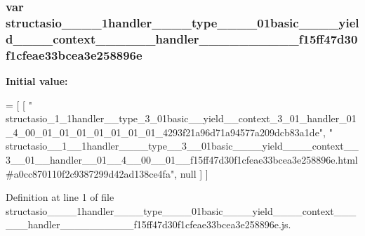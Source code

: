 \subsubsection[{structasio\+\_\+\+\_\+1\+\_\+\+\_\+1handler\+\_\+\+\_\+\+\_\+\+\_\+type\+\_\+\+\_\+3\+\_\+\+\_\+01basic\+\_\+\+\_\+\+\_\+\+\_\+yield\+\_\+\+\_\+\+\_\+\+\_\+context\+\_\+\+\_\+3\+\_\+\+\_\+01\+\_\+\+\_\+handler\+\_\+\+\_\+01\+\_\+\+\_\+4\+\_\+\+\_\+00\+\_\+\+\_\+01\+\_\+\+\_\+f15ff47d30f1cfeae33bcea3e258896e}]{\setlength{\rightskip}{0pt plus 5cm}var structasio\+\_\+\+\_\+\_\+\+\_\+1handler\+\_\+\+\_\+\+\_\+\+\_\+type\+\_\+\+\_\+\_\+\+\_\+01basic\+\_\+\+\_\+\+\_\+\+\_\+yield\+\_\+\+\_\+\+\_\+\+\_\+context\+\_\+\+\_\+\_\+\+\_\+\_\+\+\_\+handler\+\_\+\+\_\+\_\+\+\_\+\_\+\+\_\+\_\+\+\_\+\_\+\+\_\+f15ff47d30f1cfeae33bcea3e258896e}\label{structasio____1____1handler________type____3____01basic________yield________context____3____01__70a2be6274fc9174947bd309a3388a7a_aafda4fb4a820fd33c40a366363743fb2}
{\bfseries Initial value\+:}
\begin{DoxyCode}
=
[
    [ \textcolor{stringliteral}{"
      structasio\_1\_1handler\_\_type\_3\_01basic\_\_yield\_\_context\_3\_01\_handler\_01\_4\_00\_01\_01\_01\_01\_01\_01\_01\_4293f21a96d71a94577a209dcb83a1de"}, \textcolor{stringliteral}{"
      structasio\_\_1\_\_1handler\_\_\_\_type\_\_3\_\_01basic\_\_\_\_yield\_\_\_\_context\_\_3\_\_01\_\_handler\_\_01\_\_4\_\_00\_\_01\_\_f15ff47d30f1cfeae33bcea3e258896e.html#a0cc870110f2c9387299d42ad138ce4fa"}, null ]
]
\end{DoxyCode}


Definition at line 1 of file structasio\+\_\+\+\_\+\_\+\+\_\+1handler\+\_\+\+\_\+\+\_\+\+\_\+type\+\_\+\+\_\+\_\+\+\_\+01basic\+\_\+\+\_\+\+\_\+\+\_\+yield\+\_\+\+\_\+\+\_\+\+\_\+context\+\_\+\+\_\+\_\+\+\_\+\_\+\+\_\+handler\+\_\+\+\_\+\_\+\+\_\+\_\+\+\_\+\_\+\+\_\+\_\+\+\_\+f15ff47d30f1cfeae33bcea3e258896e.\+js.

